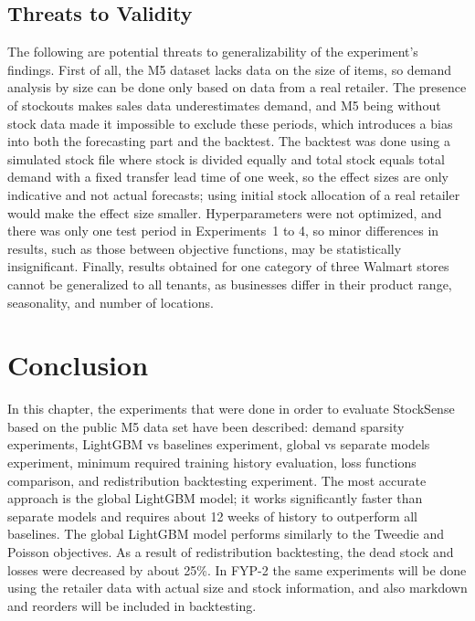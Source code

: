 \documentclass{StockSense}
\begin{document}
\subsection{Threats to Validity}

The following are potential threats to generalizability of the experiment's findings. First of all, the M5 dataset lacks data on the size of items, so demand analysis by size can be done only based on data from a real retailer. The presence of stockouts makes sales data underestimates demand, and M5 being without stock data made it impossible to exclude these periods, which introduces a bias into both the forecasting part and the backtest. The backtest was done using a simulated stock file where stock is divided equally and total stock equals total demand with a fixed transfer lead time of one week, so the effect sizes are only indicative and not actual forecasts; using initial stock allocation of a real retailer would make the effect size smaller. Hyperparameters were not optimized, and there was only one test period in Experiments~1 to 4, so minor differences in results, such as those between objective functions, may be statistically insignificant. Finally, results obtained for one category of three Walmart stores cannot be generalized to all tenants, as businesses differ in their product range, seasonality, and number of locations.

\section{Conclusion}

In this chapter, the experiments that were done in order to evaluate StockSense based on the public M5 data set have been described: demand sparsity experiments, LightGBM vs baselines experiment, global vs separate models experiment, minimum required training history evaluation, loss functions comparison, and redistribution backtesting experiment. The most accurate approach is the global LightGBM model; it works significantly faster than separate models and requires about 12 weeks of history to outperform all baselines. The global LightGBM model performs similarly to the Tweedie and Poisson objectives. As a result of redistribution backtesting, the dead stock and losses were decreased by about 25\%. In FYP-2 the same experiments will be done using the retailer data with actual size and stock information, and also markdown and reorders will be included in backtesting.

\end{document}
